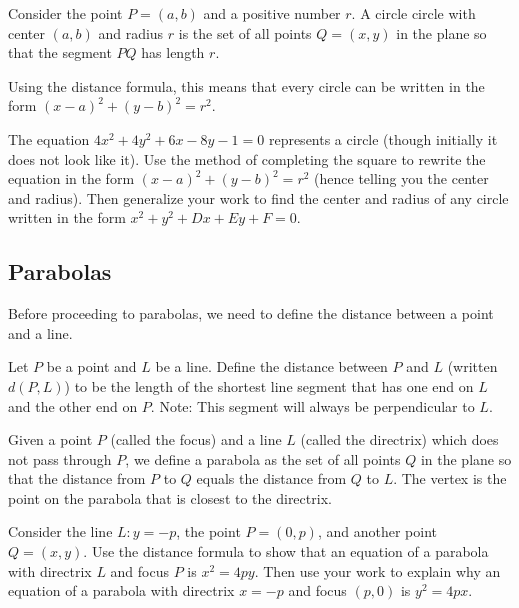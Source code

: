\begin{definition}
Consider the point $P=(a,b)$ and a positive number $r.$ A circle 
circle with center $(a,b)$ and radius $r$ is
the set of all points $Q=(x,y)$ in the plane so that the segment $PQ$ has length $r$. 
\end{definition}

Using the distance formula, this means that every circle can be written in the form $(x-a)^2+(y-b)^2=r^2$. 

\begin{problem} 
The equation $4x^2+4y^2+6x-8y-1=0$ represents a circle (though initially it does not look like it). Use the method of completing the square to rewrite the equation in the form
$(x-a)^2 + (y-b)^2 = r^2$ (hence telling you the center and radius). Then generalize
your work to find the center and radius of any circle written in the form $x^2+y^2+Dx+Ey+F=0$.
\end{problem}

\subsection{Parabolas}
Before proceeding to parabolas, we need to define the distance between a point and a line.

\begin{definition}
Let $P$ be a point and $L$ be a line.  Define the distance between $P$ and $L$ (written
$d(P,L)$) to be the length of the shortest line segment that has one end on $L$ and the other end on $P$. Note: This segment will always be perpendicular to $L$.
\end{definition}

\begin{definition}
Given a point $P$ (called the focus) and a line $L$ (called the directrix) which does not pass through $P$, we define a parabola as the set of all points $Q$ in the plane so that the distance from $P$ to $Q$ equals the distance from $Q$ to $L$. 
The vertex is the point on the parabola that is closest to the directrix.
\end{definition}

\begin{problem}  
Consider the line $L:y=-p$, the point $P=(0,p)$, and another point $Q=(x,y)$.  Use the distance formula to show that an equation of a parabola with directrix $L$ and focus $P$ is $x^2=4py$.
Then use your work to explain why an equation of a parabola with directrix $x=-p$ and focus $(p,0)$ is $y^2=4px$. 
\end{problem}

